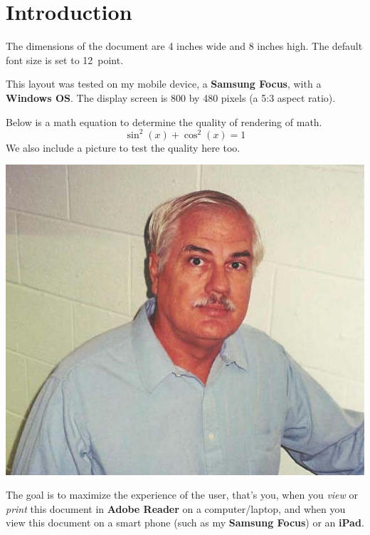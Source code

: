 \documentclass[\ifsmartphone12pt\fi,fleqn]{article}
\begin{document}
\ifsmartphone\makeinlinetitle
\else\maketitle\fi


\section{Introduction}

The dimensions of the document are 4 inches wide and 8 inches high. The
default font size is set to 12~point.

This layout was tested on my mobile device, a \textbf{\textsf{Samsung
Focus}}, with a \textbf{\textsf{Windows OS}}. The display screen is 800 by
480 pixels (a 5:3 aspect ratio).

Below is a math equation to determine the quality of rendering of math.
\[
  \sin^2(x) + \cos^2(x) = 1
\]
We also include a picture to test the quality here too.
\begin{center}
    \includegraphics[width=.67\linewidth]{dpsweb}
\end{center}

The goal is to maximize the experience of the user, that's you, when you
\emph{view} or \emph{print} this document in \textbf{Adobe Reader} on a
computer/laptop, and when you view this document on a smart phone (such as
my \textbf{\textsf{Samsung Focus}}) or an \textbf{\textsf{iPad}}.
\end{document}
